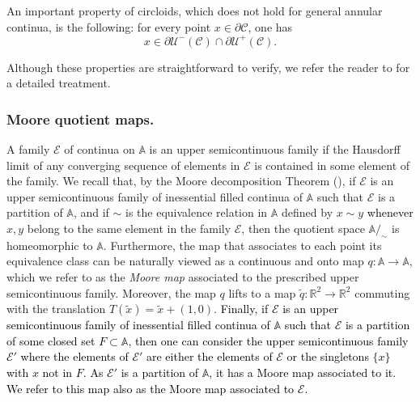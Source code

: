 \documentclass[12pt,a4paper]{amsart}
\theoremstyle{definition}
\theoremstyle{remark}
\newcommand{\R}{\mathbb{R}}
\newcommand{\Z}{\mathbb{Z}}
\newcommand{\A}{\mathbb{A}}
\begin{document}
An important property of circloids, which does not hold for general annular continua, is the following: for every point $x \in \partial \mathcal{C}$, one has
\[
x \in \partial\mathcal{U}^-(\mathcal{C}) \cap \partial\mathcal{U}^+(\mathcal{C}).
\]

Although these properties are straightforward to verify, we refer the reader to \cite{jager} for a detailed treatment.



\subsubsection{Moore quotient maps.}

A family $\mathcal{E}$ of continua on $\A$ is an upper semicontinuous family if  the Hausdorff limit of any converging sequence of elements in $\mathcal{E}$ is contained in some element of the family. We recall that, by the Moore decomposition Theorem (\cite{moore}), if $\mathcal{E}$ is an upper semicontinuous family of inessential filled continua of $\A$ such that $\mathcal{E}$ is a partition of $\A$, and if $\sim$ is the equivalence relation in $\A$ defined by $x\sim y$ \textcolor{black}{whenever} $x,y$ belong to the same element in the family $\mathcal{E}$, then the quotient space $\A/_\sim$ is homeomorphic to $\A$. Furthermore, the map that associates to each point its equivalence class can be naturally viewed as a continuous and onto map 
$q:\A\to\A$, which we refer to as the \emph{Moore map} associated to the prescribed upper semicontinuous family. Moreover, the map $q$ lifts to a map $\widetilde q:\R^2\to\R^2$ commuting with the translation $T(\widetilde x)=\widetilde x+(1,0)$. \textcolor{black}{Finally, if $\mathcal{E}$  is an upper semicontinuous family of inessential filled continua of $\A$ such that $\mathcal{E}$ is a partition of some closed set $F\subset \A$, then one can consider the upper semicontinuous family $\mathcal{E}'$ where the elements of $\mathcal{E}'$ are either the elements of $\mathcal{E}$ or the singletons $\{x\}$ with $x$ not in $F$. As $\mathcal{E}'$ is a partition of $\A$, it has a Moore map associated to it. We refer to this map also as the Moore map associated to $\mathcal{E}$.}  
\end{document}

